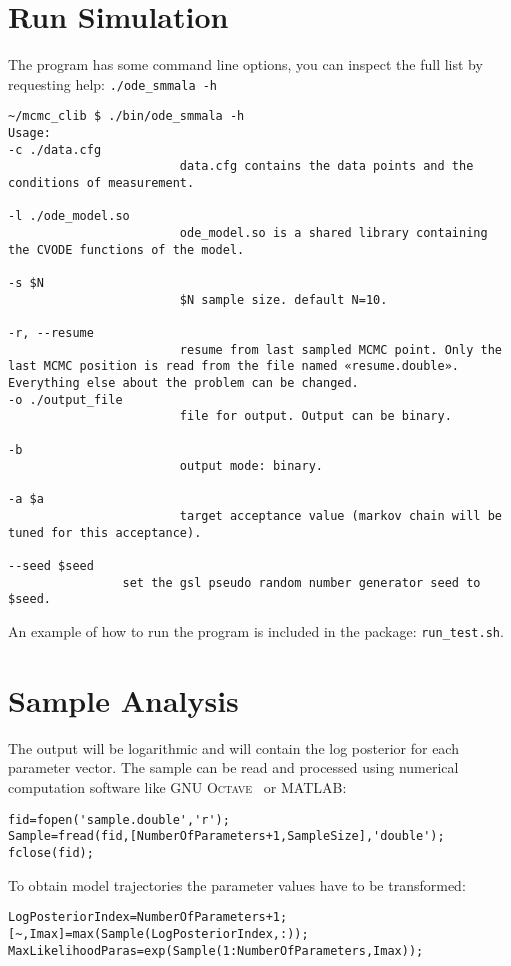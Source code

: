 \documentclass[english,12pt]{scrartcl}
\begin{document}
\section{Run Simulation}
\label{sim}

The program has some command line options, you can inspect the full list by requesting help: \texttt{./ode\_smmala -h}
\begin{verbatim}
~/mcmc_clib $ ./bin/ode_smmala -h
Usage:
-c ./data.cfg
                        data.cfg contains the data points and the conditions of measurement.

-l ./ode_model.so
                        ode_model.so is a shared library containing the CVODE functions of the model.

-s $N
                        $N sample size. default N=10.

-r, --resume
                        resume from last sampled MCMC point. Only the last MCMC position is read from the file named «resume.double». Everything else about the problem can be changed.
-o ./output_file
                        file for output. Output can be binary.

-b
                        output mode: binary.

-a $a
                        target acceptance value (markov chain will be tuned for this acceptance).

--seed $seed
                set the gsl pseudo random number generator seed to $seed.

\end{verbatim}
An example of how to run the program is included in the package:
\texttt{run\_test.sh}.


\section{Sample Analysis}
\label{sec:analysis}

The output will be logarithmic and will contain the log posterior for
each parameter vector. The sample can be read and processed using
numerical computation software like \textsc{GNU Octave}~\cite{octave:2012} or MATLAB:
\begin{verbatim}
fid=fopen('sample.double','r');
Sample=fread(fid,[NumberOfParameters+1,SampleSize],'double');
fclose(fid);
\end{verbatim}
To obtain model trajectories the parameter values have to be
transformed:
\begin{verbatim}
LogPosteriorIndex=NumberOfParameters+1;
[~,Imax]=max(Sample(LogPosteriorIndex,:));
MaxLikelihoodParas=exp(Sample(1:NumberOfParameters,Imax));
\end{verbatim}

\printbibliography
\end{document}
